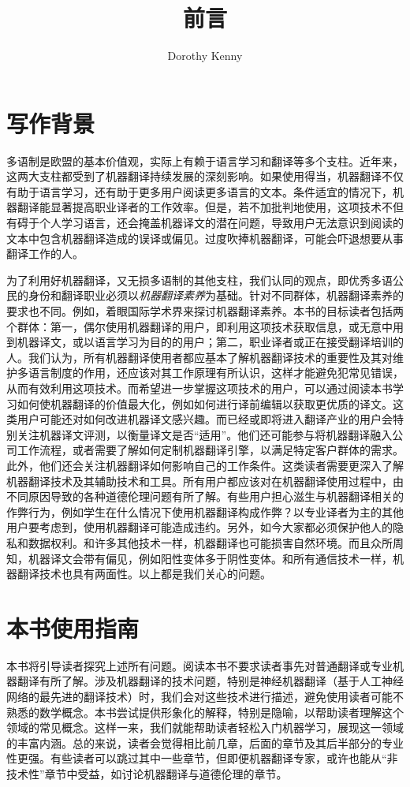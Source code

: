 \documentclass[output=paper]{langscibook}
\author{Dorothy Kenny\orcid{0000-0002-4793-9256}\affiliation{都柏林城市大学}}
\title{前言}
\begin{document}
\maketitle

\section{写作背景}
多语制是欧盟的基本价值观，实际上有赖于语言学习和翻译等多个支柱。近年来，这两大支柱都受到了机器翻译持续发展的深刻影响。如果使用得当，机器翻译不仅有助于语言学习，还有助于更多用户阅读更多语言的文本。条件适宜的情况下，机器翻译能显著提高职业译者的工作效率。但是，若不加批判地使用，这项技术不但有碍于个人学习语言，还会掩盖机器译文的潜在问题，导致用户无法意识到阅读的文本中包含机器翻译造成的误译或偏见。过度吹捧机器翻译，可能会吓退想要从事翻译工作的人。

为了利用好机器翻译，又无损多语制的其他支柱，我们认同\citet{BowkerCiro2019}的观点，即优秀多语公民的身份和翻译职业必须以\textit{机器翻译素养}为基础。针对不同群体，机器翻译素养的要求也不同。例如，\citet{BowkerCiro2019}着眼国际学术界来探讨机器翻译素养。本书的目标读者包括两个群体：第一，偶尔使用机器翻译的用户，即利用这项技术获取信息，或无意中用到机器译文，或以语言学习为目的的用户；第二，职业译者或正在接受翻译培训的人。我们认为，所有机器翻译使用者都应基本了解机器翻译技术的重要性及其对维护多语言制度的作用，还应该对其工作原理有所认识，这样才能避免犯常见错误，从而有效利用这项技术。而希望进一步掌握这项技术的用户，可以通过阅读本书学习如何使机器翻译的价值最大化，例如如何进行译前编辑以获取更优质的译文。这类用户可能还对如何改进机器译文感兴趣。而已经或即将进入翻译产业的用户会特别关注机器译文评测，以衡量译文是否“适用”。他们还可能参与将机器翻译融入公司工作流程，或者需要了解如何定制机器翻译引擎，以满足特定客户群体的需求。此外，他们还会关注机器翻译如何影响自己的工作条件。这类读者需要更深入了解机器翻译技术及其辅助技术和工具。所有用户都应该对在机器翻译使用过程中，由不同原因导致的各种道德伦理问题有所了解。有些用户担心滋生与机器翻译相关的作弊行为，例如学生在什么情况下使用机器翻译构成作弊？以专业译者为主的其他用户要考虑到，使用机器翻译可能造成违约。另外，如今大家都必须保护他人的隐私和数据权利。和许多其他技术一样，机器翻译也可能损害自然环境。而且众所周知，机器译文会带有偏见，例如阳性变体多于阴性变体。和所有通信技术一样，机器翻译技术也具有两面性。以上都是我们关心的问题。

\section{本书使用指南}
本书将引导读者探究上述所有问题。阅读本书不要求读者事先对普通翻译或专业机器翻译有所了解。涉及机器翻译的技术问题，特别是神经机器翻译（基于人工神经网络的最先进的翻译技术）时，我们会对这些技术进行描述，避免使用读者可能不熟悉的数学概念。本书尝试提供形象化的解释，特别是隐喻，以帮助读者理解这个领域的常见概念。这样一来，我们就能帮助读者轻松入门机器学习，展现这一领域的丰富内涵。总的来说，读者会觉得相比前几章，后面的章节及其后半部分的专业性更强。有些读者可以跳过其中一些章节，但即便机器翻译专家，或许也能从“非技术性”章节中受益，如讨论机器翻译与道德伦理的章节。
\end{document}
